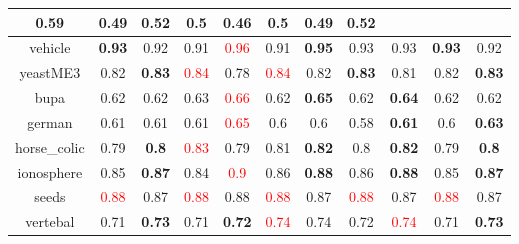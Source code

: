 \documentclass{article}%
\begin{document}
\begin{tabular}{c|cccccccccc}
{0.59
}&0.49&\textbf{0.52}&0.5&0.46&\textbf{0.5}&0.49&\textbf{0.52}\\%
\hline%
vehicle&\textbf{0.93}&0.92&0.91&\textcolor{red}{ 
0.96
}&0.91&\textbf{0.95}&0.93&0.93&\textbf{0.93}&0.92\\%
\hline%
yeastME3&0.82&\textbf{0.83}&\textcolor{red}{ 
0.84
}&0.78&\textcolor{red}{ 
0.84
}&0.82&\textbf{0.83}&0.81&0.82&\textbf{0.83}\\%
\hline%
bupa&0.62&0.62&0.63&\textcolor{red}{ 
0.66
}&0.62&\textbf{0.65}&0.62&\textbf{0.64}&0.62&0.62\\%
\hline%
german&0.61&0.61&0.61&\textcolor{red}{ 
0.65
}&0.6&0.6&0.58&\textbf{0.61}&0.6&\textbf{0.63}\\%
\hline%
horse\_colic&0.79&\textbf{0.8}&\textcolor{red}{ 
0.83
}&0.79&0.81&\textbf{0.82}&0.8&\textbf{0.82}&0.79&\textbf{0.8}\\%
\hline%
ionosphere&0.85&\textbf{0.87}&0.84&\textcolor{red}{ 
0.9
}&0.86&\textbf{0.88}&0.86&\textbf{0.88}&0.85&\textbf{0.87}\\%
\hline%
seeds&\textcolor{red}{ 
0.88
}&0.87&\textcolor{red}{ 
0.88
}&0.88&\textcolor{red}{ 
0.88
}&0.87&\textcolor{red}{ 
0.88
}&0.87&\textcolor{red}{ 
0.88
}&0.87\\%
\hline%
vertebal&0.71&\textbf{0.73}&0.71&\textbf{0.72}&\textcolor{red}{ 
0.74
}&0.74&0.72&\textcolor{red}{ 
0.74
}&0.71&\textbf{0.73}\\%
\hline%
\end{tabular}

%
\end{document}
